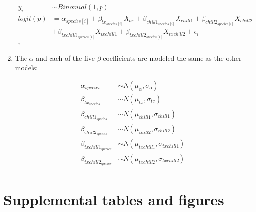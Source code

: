 \documentclass{article}\usepackage[]{graphicx}\usepackage[]{color}
\begin{document}
\begin{enumerate}
\begin{align*}
 y_i & \sim Binomial(1,p) \tag{2} \\
logit(p) &= \alpha_{species[i]} + \beta_{tx_{species[i]}}X_{tx} + \beta_{chill1_{species[i]}}X_{chill1} + \beta_{chill2_{species[i]}}X_{chill2}\\
&+ \beta_{txchill1_{species[i]}}X_{txchill1} + \beta_{txchill2_{species[i]}}X_{txchill2} + \epsilon_i \nonumber\\,
\end{align*}

\item The $\alpha$ and each of the five $\beta$ coefficients are modeled the same as the other models:

\begin{align*}
\alpha_{species} & \sim N(\mu_{\alpha}, \sigma_{\alpha}) \\
\beta_{tx_{species}} & \sim N(\mu_{tx}, \sigma_{tx}) \\
\beta_{chill1_{species}} & \sim N(\mu_{chill1}, \sigma_{chill1}) \\
\beta_{chill2_{species}} & \sim N(\mu_{chill2}, \sigma_{chill2}) \\
\beta_{txchill1_{species}} & \sim N(\mu_{txchill1}, \sigma_{txchill1}) \\
\beta_{txchill2_{species}} & \sim N(\mu_{txchill2}, \sigma_{txchill2}) \\
\end{align*}

\end{enumerate}

\section*{Supplemental tables and figures}
\end{document}
